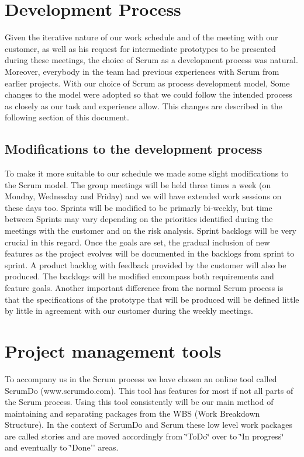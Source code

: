 
\section{Development Process}

Given the iterative nature of our work schedule and of the meeting
with our customer, as well as his request for intermediate prototypes
to be presented during these meetings, the choice of Scrum as a development
process was natural. Moreover, everybody in the team had previous
experiences with Scrum from earlier projects. With our choice of Scrum
as process development model, Some changes to the model were adopted so
that we could follow the intended process as closely as our task and experience allow.
This changes are described in the following section of this document.


\subsection{Modifications to the development process}

To make it more suitable to our schedule we made some slight modifications
to the Scrum model. The group meetings will be held three times a week (on
Monday, Wednesday and Friday) and we will have extended work sessions on these
days too. Sprints will be modified to be primarly bi-weekly, but time
between Sprints may vary depending on the priorities identified during
the meetings with the customer and on the risk analysis. Sprint backlogs
will be very crucial in this regard. Once the goals are set,
the gradual inclusion of new features as the project evolves will
be documented in the backlogs from sprint to sprint.
A product backlog with feedback provided by the customer will also be produced.
The backlogs will be modified encompass both requirements and feature goals.
Another important difference from the normal Scrum process is that the
specifications of the prototype that will be produced will be defined
little by little in agreement with our customer during the weekly meetings.

\section{Project management tools}

To accompany us in the Scrum process we have chosen an online tool
called ScrumDo (www.scrumdo.com). This tool has features for most
if not all parts of the Scrum process. Using this tool consistently
will be our main method of maintaining and separating packages from
the WBS (Work Breakdown Structure). In the context of ScrumDo and
Scrum these low level work packages are called stories and are moved
accordingly from \char`\"{}ToDo\char`\"{} over to \char`\"{}In progress\char`\"{}
and eventually to \char`\"{}Done'' areas.
	
